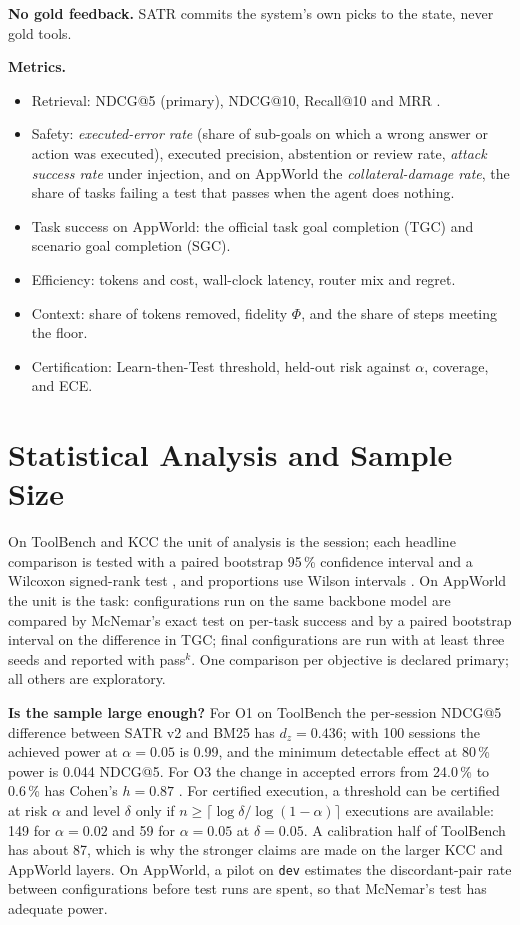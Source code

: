 \textbf{No gold feedback.} SATR commits the system's own picks to the state, never gold tools.

\textbf{Metrics.}
\begin{itemize}[leftmargin=*]
\item Retrieval: NDCG@5 (primary), NDCG@10, Recall@10 and MRR \citep{jarvelin2002cumulated}.
\item Safety: \emph{executed-error rate} (share of sub-goals on which a wrong answer or action was
executed), executed precision, abstention or review rate, \emph{attack success rate} under injection,
and on AppWorld the \emph{collateral-damage rate}, the share of tasks failing a test that passes when the
agent does nothing.
\item Task success on AppWorld: the official task goal completion (TGC) and scenario goal completion (SGC).
\item Efficiency: tokens and cost, wall-clock latency, router mix and regret.
\item Context: share of tokens removed, fidelity $\Phi$, and the share of steps meeting the floor.
\item Certification: Learn-then-Test threshold, held-out risk against $\alpha$, coverage, and ECE.
\end{itemize}

\section{Statistical Analysis and Sample Size}
\label{sec:method-stats}

On ToolBench and KCC the unit of analysis is the session; each headline comparison is tested with a
paired bootstrap 95\,\% confidence interval \citep{efron1993bootstrap} and a Wilcoxon signed-rank test
\citep{wilcoxon1945individual}, and proportions use Wilson intervals \citep{wilson1927probable}. On
AppWorld the unit is the task: configurations run on the same backbone model are compared by McNemar's
exact test on per-task success \citep{mcnemar1947note} and by a paired bootstrap interval on the
difference in TGC; final configurations are run with at least three seeds and reported with pass$^k$.
One comparison per objective is declared primary; all others are exploratory.

\textbf{Is the sample large enough?} For O1 on ToolBench the per-session NDCG@5 difference between SATR
v2 and BM25 has $d_z = 0.436$; with 100 sessions the achieved power at $\alpha = 0.05$ is 0.99, and the
minimum detectable effect at 80\,\% power is 0.044 NDCG@5. For O3 the change in accepted errors from
24.0\,\% to 0.6\,\% has Cohen's $h = 0.87$ \citep{cohen1988power}. For certified execution, a threshold
can be certified at risk $\alpha$ and level $\delta$ only if $n \ge \lceil\log\delta/\log(1-\alpha)\rceil$
executions are available: 149 for $\alpha = 0.02$ and 59 for $\alpha = 0.05$ at $\delta = 0.05$. A
calibration half of ToolBench has about 87, which is why the stronger claims are made on the larger KCC
and AppWorld layers. On AppWorld, a pilot on \texttt{dev} estimates the discordant-pair rate between
configurations before test runs are spent, so that McNemar's test has adequate power.


